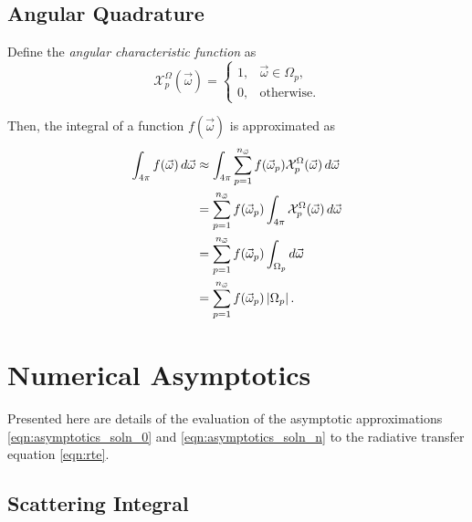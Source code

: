 \subsection{Angular Quadrature}
Define the \textit{angular characteristic function} as
\begin{equation*}
  \mathcal{X}^\Omega_p(\vec{\omega}) = \begin{cases}
    1, & \vec{\omega} \in \Omega_p, \\
    0, & \mbox{otherwise}.
  \end{cases}
\end{equation*}


Then, the integral of a function $f(\vec{\omega})$ is approximated as
\begin{align*}
  \int_{4\pi} f(\vec{\omega})\, d\vec{\omega} &\approx \int_{4\pi} \sum_{p=1}^{n_{\vec{\omega}}} f(\vec{\omega}_p) \mathcal{X}^\Omega_p(\vec{\omega})\, d\vec{\omega} \\
  &= \sum_{p=1}^{n_{\vec{\omega}}} f(\vec{\omega}_p) \int_{4\pi} \mathcal{X}^\Omega_p(\vec{\omega})\, d\vec{\omega} \\
  &= \sum_{p=1}^{n_{\vec{\omega}}} f(\vec{\omega}_p) \int_{\Omega_p} d\vec{\omega} \\
  &= \sum_{p=1}^{n_{\vec{\omega}}} f(\vec{\omega}_p) \left| \Omega_p \right|.
\end{align*}

\section{Numerical Asymptotics}
Presented here are details of the evaluation of the asymptotic approximations \eqref{eqn:asymptotics_soln_0} and \eqref{eqn:asymptotics_soln_n} to the radiative transfer equation \eqref{eqn:rte}.

\subsection{Scattering Integral}
\label{sec:scatter_integral}


